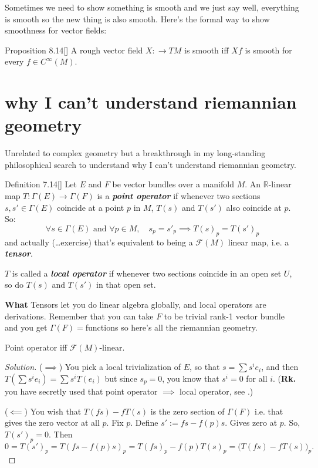 Sometimes we need to show something is smooth and we just say well, everything is smooth so the new thing is also smooth. Here's the formal way to show smoothness for vector fields:

\begin{thing7}{Proposition 8.14}[\cite{les}]\leavevmode
A rough vector field \(X : \to TM\) is smooth iff \(Xf\) is smooth for every \(f\in C^\infty(M)\).
\end{thing7}

\section{why I can't understand riemannian geometry}

Unrelated to complex geometry but a breakthrough in my long-standing philosophical search to understand why I can't understand riemannian geometry.

\begin{thing4}{Definition 7.14}[\cite{tud}]\label{def:7.14}\leavevmode
Let \(E\) and \(F\) be vector bundles over a manifold \(M\). An \(\mathbb{R}\)-linear map \(T:\Gamma(E)\longrightarrow \Gamma(F)\) is a \textit{\textbf{point operator}} if whenever two sections \(s,s' \in \Gamma(E)\) coincide at a point \(p\) in \(M\), \(T(s)\) and \(T(s')\) also coincide at \(p\). So:
\[\forall s \in \Gamma(E)\text{ and } \forall  p \in M, \quad s_p=s'_p \implies T(s)_p=T(s')_p\]
and actually (…exercise) that's equivalent to being a \(\mathcal{F}(M)\) linear map, i.e. a \textit{\textbf{tensor}}.

\(T\) is called a \textit{\textbf{local operator}} if whenever two sections coincide in an open set \(U\), so do \(T(s)\) and  \(T(s')\) in that open set.

{\color{2}\bfseries What}\hspace{.5em} Tensors let you do linear algebra globally, and local operators are derivations. Remember that you can take \(F\) to be trivial rank-1 vector bundle and you get \(\Gamma(F)=\)functions so here's all the riemannian geometry.
\end{thing4}

\begin{exercise}\leavevmode
Point operator iff \(\mathcal{F}(M)\)-linear.
\end{exercise}

\begin{proof}[Solution]\leavevmode
(\(\implies\)) You pick a local trivialization of \(E\), so that \(s=\sum s^ie_i\), and then
\(T\left(\sum s^ie_i\right)=\sum s^i T(e_i)\) but since \(s_p=0\), you know that \(s^i=0\) for all \(i\). (\textbf{Rk.}  you have secretly used that point operator \(\implies\) local operator, see \cite{tud}.)

(\(\impliedby\)) You wish that \(T(fs)-fT(s)\) is the zero section of  \(\Gamma(F)\) i.e. that gives the zero vector at all \(p\). Fix \(p\). Define \(s':=fs - f(p)s\). Gives zero at \(p\). So, \(T(s')_p=0\). Then
 \[0=T(s')_p=T(fs-f(p)s)_p=T(fs)_p-f(p)T(s)_p=\Big(T(fs)-fT(s)\Big)_p.\]

\end{proof}

